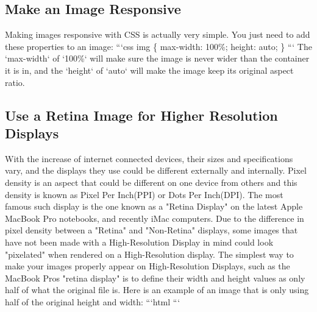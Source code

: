 \documentclass{article}%
\begin{document}
%
\subsection{Make an Image Responsive}%
\label{subsec:MakeanImageResponsive}%
Making images responsive with CSS is actually very simple. You just need to add these properties to an image:\newline%
```css\newline%
img \{\newline%
  max{-}width: 100\%;\newline%
  height: auto;\newline%
\}\newline%
```\newline%
The `max{-}width` of `100\%` will make sure the image is never wider than the container it is in, and the `height` of `auto` will make the image keep its original aspect ratio.\newline%

%
\subsection{Use a Retina Image for Higher Resolution Displays}%
\label{subsec:UseaRetinaImageforHigherResolutionDisplays}%
With the increase of internet connected devices, their sizes and specifications vary, and the displays they use could be different externally and internally. Pixel density is an aspect that could be different on one device from others and this density is known as Pixel Per Inch(PPI) or Dots Per Inch(DPI). The most famous such display is the one known as a "Retina Display" on the latest Apple MacBook Pro notebooks, and recently iMac computers. Due to the difference in pixel density between a "Retina" and "Non{-}Retina" displays, some images that have not been made with a High{-}Resolution Display in mind could look "pixelated" when rendered on a High{-}Resolution display.\newline%
The simplest way to make your images properly appear on High{-}Resolution Displays, such as the MacBook Pros "retina display" is to define their width and height values as only half of what the original file is.\newline%
Here is an example of an image that is only using half of the original height and width:\newline%
```html\newline%
```\newline%

%
\end{document}
